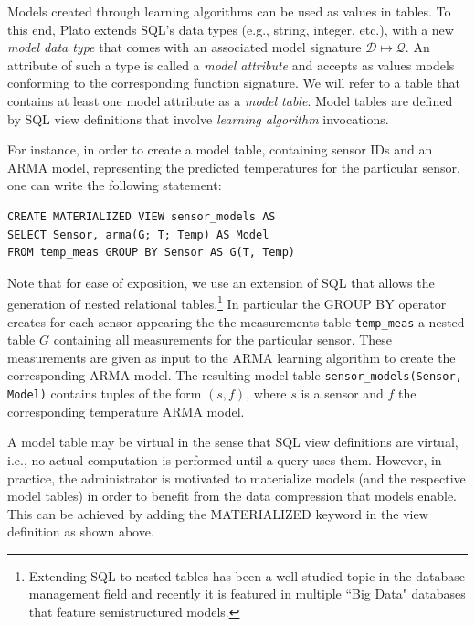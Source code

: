 Models created through learning algorithms can be used as values in tables. To this end, Plato extends SQL's data types (e.g., string, integer, etc.), with a new {\em model data type} that comes with an associated model signature $\mathcal{D}\mapsto \mathcal{Q}$. An attribute of such a type is called a {\em model attribute} and accepts as values models conforming to the corresponding function signature. We will refer to a table that contains at least one model attribute as a {\em model table}. Model tables are defined by SQL view definitions that involve {\em learning algorithm} invocations. 

\vspace*{0.5cm}
\begin{example}
\label{xmpl:models-and-definitions}
For instance, in order to create a model table, containing sensor IDs and an ARMA model, representing the predicted temperatures for the particular sensor, one can write the following statement:

\begin{verbatim}
CREATE MATERIALIZED VIEW sensor_models AS 
SELECT Sensor, arma(G; T; Temp) AS Model
FROM temp_meas GROUP BY Sensor AS G(T, Temp)
\end{verbatim}

Note that for ease of exposition, we use an extension of SQL that allows the generation of nested relational tables.\footnote{Extending SQL to nested tables has been a well-studied topic in the database management field and recently it is featured in multiple ``Big Data" databases that feature semistructured models. 
}
In particular the GROUP BY operator creates for each sensor appearing the the measurements table \texttt{temp\_meas} a nested table $G$ containing all measurements for the particular sensor. These measurements are given as input to the ARMA learning algorithm to create the corresponding ARMA model.
The resulting model table \texttt{sensor\_models(Sensor, Model)} contains tuples of the form $(s, f)$, where $s$ is a sensor and $f$ the corresponding temperature ARMA model.
\end{example}
\vspace*{0.5cm}

A model table may be virtual in the sense that SQL view definitions are virtual, i.e., no actual computation is performed until a query uses them. However, in practice, the administrator is motivated to materialize models (and the  respective model tables) in order to benefit from the data compression that models enable. This can be achieved by adding the MATERIALIZED keyword in the view definition as shown above.

